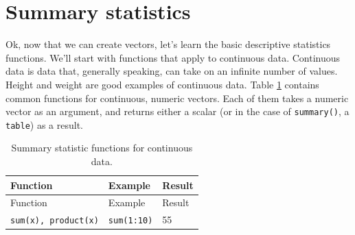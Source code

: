 \documentclass[]{book}
\theoremstyle{definition}
\theoremstyle{definition}
\theoremstyle{remark}
\begin{document}
\section{Summary statistics}\label{summary-statistics}

Ok, now that we can create vectors, let's learn the basic descriptive
statistics functions. We'll start with functions that apply to
continuous data. Continuous data is data that, generally speaking, can
take on an infinite number of values. Height and weight are good
examples of continuous data. Table
\ref{tab:continuousvectorfunctiontable} contains common functions for
continuous, numeric vectors. Each of them takes a numeric vector as an
argument, and returns either a scalar (or in the case of
\texttt{summary()}, a \texttt{table}) as a result.

\begin{longtable}[]{@{}lll@{}}
\caption{\label{tab:continuousvectorfunctiontable} Summary statistic
functions for continuous data.}\tabularnewline
\toprule
\begin{minipage}[b]{0.27\columnwidth}\raggedright\strut
Function\strut
\end{minipage} & \begin{minipage}[b]{0.30\columnwidth}\raggedright\strut
Example\strut
\end{minipage} & \begin{minipage}[b]{0.32\columnwidth}\raggedright\strut
Result\strut
\end{minipage}\tabularnewline
\midrule
\endfirsthead
\toprule
\begin{minipage}[b]{0.27\columnwidth}\raggedright\strut
Function\strut
\end{minipage} & \begin{minipage}[b]{0.30\columnwidth}\raggedright\strut
Example\strut
\end{minipage} & \begin{minipage}[b]{0.32\columnwidth}\raggedright\strut
Result\strut
\end{minipage}\tabularnewline
\midrule
\endhead
\begin{minipage}[t]{0.27\columnwidth}\raggedright\strut
\texttt{sum(x),\ product(x)}\strut
\end{minipage} & \begin{minipage}[t]{0.30\columnwidth}\raggedright\strut
\texttt{sum(1:10)}\strut
\end{minipage} & \begin{minipage}[t]{0.32\columnwidth}\raggedright\strut
55\strut
\end{minipage}\tabularnewline

\end{longtable}
\end{document}
